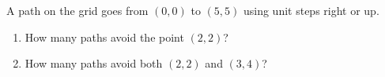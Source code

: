 A path on the grid goes from $(0,0)$ to $(5,5)$ using unit steps right or up.
\begin{enumerate}
\item[(a)] How many paths avoid the point $(2,2)$?
\item[(b)] How many paths avoid both $(2,2)$ and $(3,4)$?
\end{enumerate}

